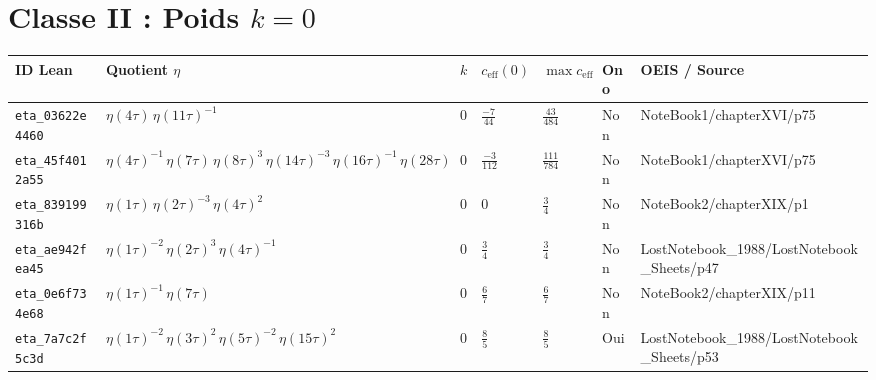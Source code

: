 \documentclass[11pt,twoside,openright]{book}
\begin{document}
\section{Classe II : Poids $k = 0$}
\begin{longtable}{p{2.3cm}p{4.3cm}llllp{2.3cm}}
\toprule
\textbf{ID Lean} & \textbf{Quotient $\eta$} & $k$ & $c_{\text{eff}}(0)$ & $\max c_{\text{eff}}$ & \textbf{Ono} & \textbf{OEIS / Source} \\
\midrule
\endhead
\texttt{eta\_03622e4460} & $\eta(4\tau)\, \eta(11\tau)^{-1}$ & $0$ & $\frac{-7}{44}$ & $\frac{43}{484}$ & Non & NoteBook1/chapterXVI/p75 \\
\texttt{eta\_45f4012a55} & $\eta(4\tau)^{-1}\, \eta(7\tau)\, \eta(8\tau)^{3}\, \eta(14\tau)^{-3}\, \eta(16\tau)^{-1}\, \eta(28\tau)$ & $0$ & $\frac{-3}{112}$ & $\frac{111}{784}$ & Non & NoteBook1/chapterXVI/p75 \\
\texttt{eta\_839199316b} & $\eta(1\tau)\, \eta(2\tau)^{-3}\, \eta(4\tau)^{2}$ & $0$ & $0$ & $\frac{3}{4}$ & Non & NoteBook2/chapterXIX/p1 \\
\texttt{eta\_ae942fea45} & $\eta(1\tau)^{-2}\, \eta(2\tau)^{3}\, \eta(4\tau)^{-1}$ & $0$ & $\frac{3}{4}$ & $\frac{3}{4}$ & Non & LostNotebook\_1988/LostNotebook\_Sheets/p47 \\
\texttt{eta\_0e6f734e68} & $\eta(1\tau)^{-1}\, \eta(7\tau)$ & $0$ & $\frac{6}{7}$ & $\frac{6}{7}$ & Non & NoteBook2/chapterXIX/p11 \\
\texttt{eta\_7a7c2f5c3d} & $\eta(1\tau)^{-2}\, \eta(3\tau)^{2}\, \eta(5\tau)^{-2}\, \eta(15\tau)^{2}$ & $0$ & $\frac{8}{5}$ & $\frac{8}{5}$ & Oui & LostNotebook\_1988/LostNotebook\_Sheets/p53 \\
\bottomrule
\end{longtable}
\end{document}
